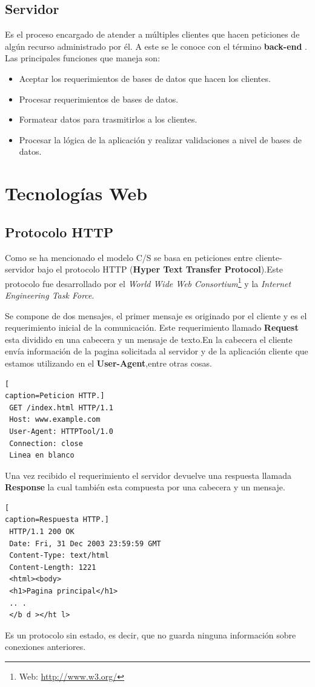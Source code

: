 \subsection*{Servidor}
Es el proceso encargado de atender a múltiples clientes que hacen peticiones de algún recurso administrado por él. A este se le conoce con el término \textbf{back-end }.
\\Las principales funciones  que maneja son:
\begin{itemize}
\item Aceptar los requerimientos de bases de datos que hacen los clientes.
\item Procesar requerimientos de bases de datos.
\item Formatear datos para trasmitirlos a los clientes.
\item Procesar la lógica de la aplicación y realizar validaciones a nivel de bases de datos.
\end{itemize}
\section{Tecnologías Web}
\subsection*{Protocolo HTTP}
Como se ha mencionado el modelo C/S se basa en peticiones entre cliente-servidor bajo el protocolo HTTP (\textbf{Hyper Text Transfer Protocol}).Este protocolo fue desarrollado por el \textit{World Wide Web Consortium}\footnote{Web: \url{http://www.w3.org/}} y la \textit{Internet Engineering Task Force}. 

Se compone de dos mensajes, el primer mensaje es originado por el cliente y es el requerimiento inicial de la comunicación. Este requerimiento llamado \textbf{Request} esta dividido en una cabecera y un mensaje de texto.En la cabecera el cliente envía información de la pagina solicitada al servidor y de la aplicación cliente que estamos utilizando en el \textbf{User-Agent},entre otras cosas.
\begin{lstlisting}[
caption=Peticion HTTP.]
 GET /index.html HTTP/1.1
 Host: www.example.com
 User-Agent: HTTPTool/1.0
 Connection: close
 Linea en blanco
\end{lstlisting}
Una vez recibido el requerimiento el servidor devuelve una respuesta llamada \textbf{Response} la cual también esta compuesta por una cabecera y un mensaje.
\begin{lstlisting}[
caption=Respuesta HTTP.]
 HTTP/1.1 200 OK
 Date: Fri, 31 Dec 2003 23:59:59 GMT
 Content-Type: text/html
 Content-Length: 1221
 <html><body>
 <h1>Pagina principal</h1>
 .. .
 </b d ></ht l>
\end{lstlisting}
Es un protocolo sin estado, es decir, que no guarda ninguna información sobre conexiones anteriores.

